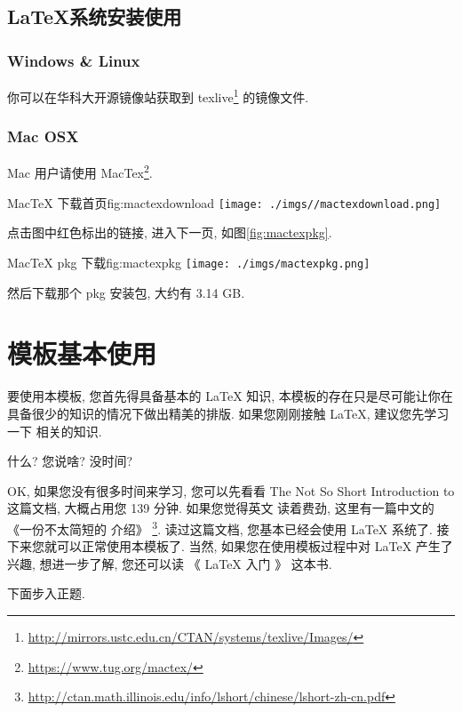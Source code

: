 \documentclass[bibsec, master, figtoc, tabtoc]{cugthesis}
\begin{document}
\subsection{\LaTeX{}系统安装使用}
\label{sub:xi_tong_an_zhuang_shi_yong_}
\subsubsection{Windows \& Linux}
\label{ssub:Windows_Linux}
你可以在华科大开源镜像站获取到 texlive\footnote{\url{http://mirrors.ustc.edu.cn/CTAN/systems/texlive/Images/}}
的镜像文件.

\subsubsection{Mac OSX}
\label{ssub:Mac_OSX}
Mac 用户请使用 MacTex\footnote{\url{https://www.tug.org/mactex/}}.

\begin{tfig}{MacTeX 下载首页}{fig:mactexdownload}
\texttt{[image: ./imgs//mactexdownload.png]}
\end{tfig}

点击图中红色标出的链接, 进入下一页, 如图\ref{fig:mactexpkg}.

\begin{tfig}{MacTeX pkg 下载}{fig:mactexpkg}
\texttt{[image: ./imgs/mactexpkg.png]}
\end{tfig}

然后下载那个 pkg 安装包, 大约有 3.14 GB\@.
\section{模板基本使用}
\label{sec:mo_ban_ji_ben_shi_yong_}
要使用本模板, 您首先得具备基本的 \LaTeX{} 知识, 本模板的存在只是尽可能让你在
具备很少的知识的情况下做出精美的排版. 如果您刚刚接触 \LaTeX{}, 建议您先学习一下
相关的知识.

什么? 您说啥? 没时间?

OK, 如果您没有很多时间来学习, 您可以先看看 The Not So Short Introduction to
\LaTeXe{} \cite{oetiker_not_2018} 这篇文档, 大概占用您 139 分钟. 如果您觉得英文
读着费劲, 这里有一篇中文的《一份不太简短的 \LaTeXe{} 介绍》
\footnote{\url{http://ctan.math.illinois.edu/info/lshort/chinese/lshort-zh-cn.pdf}}.
读过这篇文档, 您基本已经会使用 \LaTeX{} 系统了. 接下来您就可以正常使用本模板了.
当然, 如果您在使用模板过程中对 \LaTeX{} 产生了兴趣, 想进一步了解, 您还可以读
《 \LaTeX{} 入门 》\cite{_latex_2013} 这本书.

下面步入正题.
\end{document}
